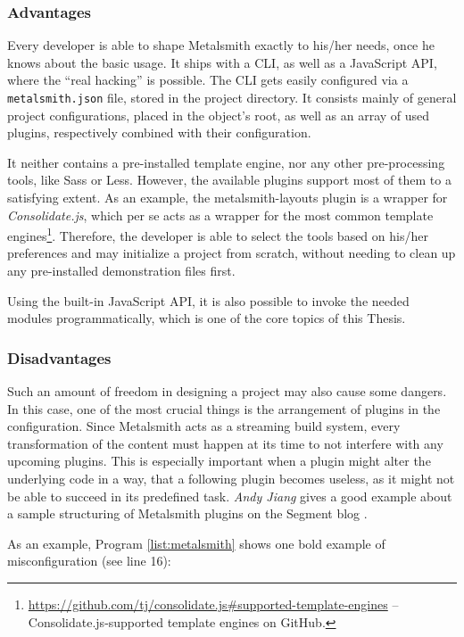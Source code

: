 \subsubsection{Advantages}
Every developer is able to shape Metalsmith exactly to his/her needs, once he knows about the basic usage. It ships with a CLI, as well as a JavaScript API, where the ``real hacking'' is possible. The CLI gets easily configured via a \texttt{metalsmith.json} file, stored in the project directory. It consists mainly of general project configurations, placed in the object's root, as well as an array of used plugins, respectively combined with their configuration.

It neither contains a pre-installed template engine, nor any other pre-processing tools, like Sass or Less. However, the available plugins support most of them to a satisfying extent. As an example, the metalsmith-layouts plugin is a wrapper for \emph{Consolidate.js}, which per se acts as a wrapper for the most common template engines\footnote{\url{https://github.com/tj/consolidate.js\#supported-template-engines} -- Consolidate.js-supported template engines on GitHub.}. Therefore, the developer is able to select the tools based on his/her preferences and may initialize a project from scratch, without needing to clean up any pre-installed demonstration files first.

Using the built-in JavaScript API, it is also possible to invoke the needed modules programmatically, which is one of the core topics of this Thesis.

\subsubsection{Disadvantages}
Such an amount of freedom in designing a project may also cause some dangers. In this case, one of the most crucial things is the arrangement of plugins in the configuration. Since Metalsmith acts as a streaming build system, every transformation of the content must happen at its time to not interfere with any upcoming plugins. This is especially important when a plugin might alter the underlying code in a way, that a following plugin becomes useless, as it might not be able to succeed in its predefined task. \emph{Andy Jiang} gives a good example about a sample structuring of Metalsmith plugins on the Segment blog \cite{Metalsmith2015technicaldocumentation}.

As an example, Program \ref{list:metalsmith} shows one bold example of misconfiguration (see line 16):

